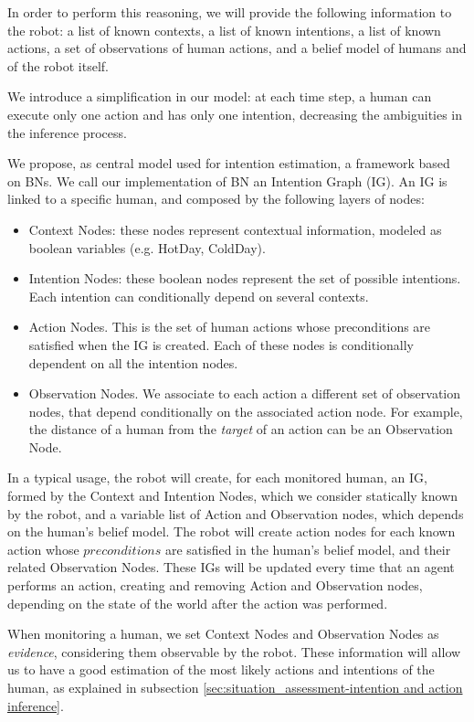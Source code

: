 In order to perform this reasoning, we will provide the following information to the robot: a list of known contexts, a list of known intentions, a list of known actions, a set of observations of human actions, and a belief model of humans and of the robot itself.

We introduce a simplification in our model: at each time step, a human can execute only one action and has only one intention, decreasing the ambiguities in the inference process.

We propose, as central model used for intention estimation, a framework based on BNs. We call our implementation of BN an Intention Graph (IG).
An IG is linked to a specific human, and composed by the following layers of nodes:
\begin{itemize}
\item Context Nodes: these nodes represent contextual information, modeled as boolean variables (e.g. HotDay, ColdDay).
\item Intention Nodes: these boolean nodes represent the set of possible intentions. Each intention can conditionally depend on several contexts.
\item Action Nodes. This is the set of human actions whose preconditions are satisfied when the IG is created. Each of these nodes is conditionally dependent on all the intention nodes. 
\item Observation Nodes. We associate to each action a different set of observation nodes, that depend conditionally on the associated action node. For example, the distance of a human from the \textit{target} of an action can be an Observation Node.
\end{itemize}

In a typical usage, the robot will create, for each monitored human, an IG, formed by the Context and Intention Nodes, which we consider statically known by the robot, and a variable list of Action and Observation nodes, which depends on the human's belief model. The robot will create action nodes for each known action whose $preconditions$ are satisfied in the human's belief model, and their related Observation Nodes. These IGs will be updated every time that an agent performs an action, creating and removing Action and Observation nodes, depending on the state of the world after the action was performed.

When monitoring a human, we set Context Nodes and Observation Nodes as \textit{evidence}, considering them observable by the robot. These information will allow us to have a good estimation of the most likely actions and intentions of the human, as explained in subsection \ref{sec:situation_assessment-intention and action inference}. 


